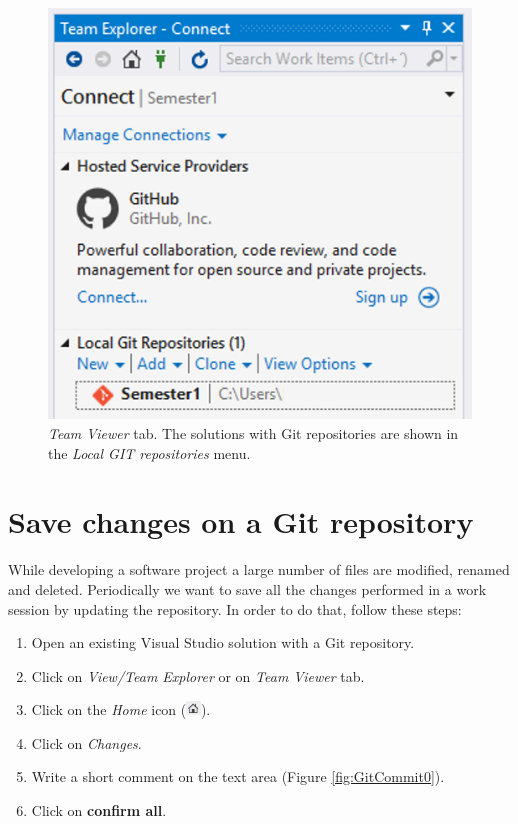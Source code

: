 \begin{figure}[h]
    \centering
    \includegraphics[width=0.5 \textwidth]{Figures/G1V2.png}
    \caption{\textit{Team Viewer} tab. The solutions with Git repositories are shown in the \textit{Local GIT repositories} menu.}
    \label{fig:Git1}
\end{figure}


    \section{Save changes on a Git repository}

While developing a software project a large number of files are modified, renamed and deleted. Periodically we want to save all the changes performed in a work session by updating the repository. In order to do that, follow these steps:

\begin{enumerate}
    \item Open an existing Visual Studio solution with a Git repository.
    \item Click on \textit{View/Team Explorer} or on \textit{Team Viewer} tab.
    \item Click on the \textit{Home} icon (\includegraphics[height=11pt]{./Figures/Home.png}).
    \item Click on \textit{Changes}.
    \item Write a short comment on the text area (Figure \ref{fig:GitCommit0}).
    \item Click on \textbf{confirm all}.
\end{enumerate}

